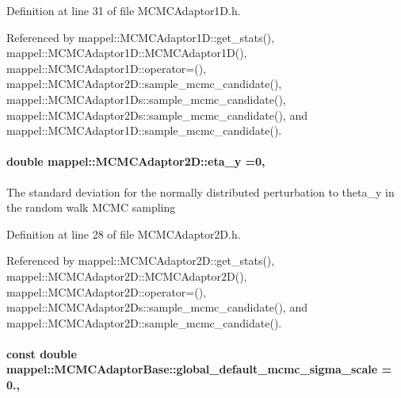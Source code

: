 Definition at line 31 of file M\+C\+M\+C\+Adaptor1\+D.\+h.



Referenced by mappel\+::\+M\+C\+M\+C\+Adaptor1\+D\+::get\+\_\+stats(), mappel\+::\+M\+C\+M\+C\+Adaptor1\+D\+::\+M\+C\+M\+C\+Adaptor1\+D(), mappel\+::\+M\+C\+M\+C\+Adaptor1\+D\+::operator=(), mappel\+::\+M\+C\+M\+C\+Adaptor2\+D\+::sample\+\_\+mcmc\+\_\+candidate(), mappel\+::\+M\+C\+M\+C\+Adaptor1\+Ds\+::sample\+\_\+mcmc\+\_\+candidate(), mappel\+::\+M\+C\+M\+C\+Adaptor2\+Ds\+::sample\+\_\+mcmc\+\_\+candidate(), and mappel\+::\+M\+C\+M\+C\+Adaptor1\+D\+::sample\+\_\+mcmc\+\_\+candidate().

\paragraph[{\texorpdfstring{eta\+\_\+y}{eta_y}}]{\setlength{\rightskip}{0pt plus 5cm}double mappel\+::\+M\+C\+M\+C\+Adaptor2\+D\+::eta\+\_\+y =0\hspace{0.3cm}{\ttfamily [protected]}, {\ttfamily [inherited]}}\hypertarget{classmappel_1_1MCMCAdaptor2D_a8e49652147538fe2a12943522f1a8b30}{}\label{classmappel_1_1MCMCAdaptor2D_a8e49652147538fe2a12943522f1a8b30}
The standard deviation for the normally distributed perturbation to theta\+\_\+y in the random walk M\+C\+MC sampling 

Definition at line 28 of file M\+C\+M\+C\+Adaptor2\+D.\+h.



Referenced by mappel\+::\+M\+C\+M\+C\+Adaptor2\+D\+::get\+\_\+stats(), mappel\+::\+M\+C\+M\+C\+Adaptor2\+D\+::\+M\+C\+M\+C\+Adaptor2\+D(), mappel\+::\+M\+C\+M\+C\+Adaptor2\+D\+::operator=(), mappel\+::\+M\+C\+M\+C\+Adaptor2\+Ds\+::sample\+\_\+mcmc\+\_\+candidate(), and mappel\+::\+M\+C\+M\+C\+Adaptor2\+D\+::sample\+\_\+mcmc\+\_\+candidate().

\paragraph[{\texorpdfstring{global\+\_\+default\+\_\+mcmc\+\_\+sigma\+\_\+scale}{global_default_mcmc_sigma_scale}}]{\setlength{\rightskip}{0pt plus 5cm}const double mappel\+::\+M\+C\+M\+C\+Adaptor\+Base\+::global\+\_\+default\+\_\+mcmc\+\_\+sigma\+\_\+scale = 0.\hspace{0.3cm}{\ttfamily [static]}, {\ttfamily [inherited]}}\hypertarget{classmappel_1_1MCMCAdaptorBase_a44cebca0e27135c854fa8430d2d89929}{}\label{classmappel_1_1MCMCAdaptorBase_a44cebca0e27135c854fa8430d2d89929}


